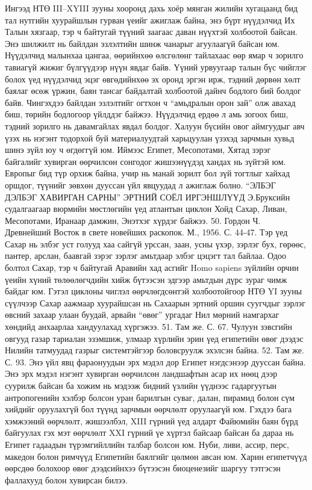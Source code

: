 Ингээд НТӨ III–XYIII зууны хооронд дахь хоёр мянган жилийн хугацаанд бид тал нутгийн хуурайшлын гурван үеийг ажиглаж байна, энэ бүрт нүүдэлчид Их Талын хязгаар, тэр ч байтугай түүний заагаас даван нүүхтэй холбоотой байсан. Энэ шилжилт нь байлдан эзлэлтийн шинж чанарыг агуулаагүй байсан юм. Нүүдэлчид малынхаа цангаа, өөрийнхөө өлсгөлөнг тайлахаас өөр ямар ч зорилго тавиагүй жижиг бүлгүүдээр нүүн явдаг байв.
Үүний урвуугаар талын бүс чийглэг болох үед нүүдэлчид эцэг өвгөдийнхөө эх оронд эргэн ирж, тэдний дөрвөн хөлт баялаг өсөж үржин, баян тансаг байдалтай холбоотой дайнч бодлого бий болдог байв. Чингэхдээ байлдан эзлэлтийг огтхон ч “амьдралын орон зай” олж авахад биш, төрийн бодлогоор үйлддэг байжээ. Нүүдэлчид ердөө л амь зогоох биш, тэдний зорилго нь давамгайлах явдал болдог.
Халуун бүсийн овог аймгуудыг авч үзэх нь нэгэнт тодорхой буй материалуудтай харьцуулан үзэхэд зарчмын хувьд шинэ зүйл юу ч өгдөггүй юм. Иймээс Египет, Месопотами, Хятад зэрэг байгалийг хувирган өөрчилсөн сонгодог жишээнүүдэд хандах нь зүйтэй юм. Европыг бид түр орхиж байна, учир нь манай зорилт бол зүй тогтлыг хайхад оршдог, түүнийг зөвхөн дууссан үйл явцуудад л ажиглаж болно.
“ЭЛБЭГ ДЭЛБЭГ ХАВИРГАН САРНЫ” ЭРТНИЙ СОЁЛ ИРГЭНШЛҮҮД
Э.Бруксийн судалгаагаар вюрмийн мөстлөгийн үед атлантын циклон Хойд Сахар, Ливан, Месопотами, Иранаар дамжин, Энэтхэг хүрдэг байжээ. 50. Гордон Ч. Древнейший Восток в свете новейших раскопок. М., 1956. С. 44-47.
Тэр үед Сахар нь элбэг уст голууд хаа сайгүй урссан, заан, усны үхэр, зэрлэг бух, гөрөөс, пантер, арслан, баавгай зэрэг зэрлэг амьтдаар элбэг цэцэгт тал байлаа. Одоо болтол Сахар, тэр ч байтугай Аравийн хад асгийг Homo sapiens зүйлийн орчин үеийн хүний төлөөлөгчдийн хийж бүтээсэн эдгээр амьтдын дүрс зураг чимж байдаг юм. Гэтэл циклоны чиглэл өөрчлөгдсөнтэй холбоотойгоор НТӨ YI зууны сүүлчээр Сахар аажмаар хуурайшсан нь Сахаарын эртний оршин суугчдыг зэрлэг өвсний захаар улаан буудай, арвайн “өвөг” ургадаг Нил мөрний намгархаг хөндийд анхаарлаа хандуулахад хүргэжээ. 51. Там же. С. 67.
Чулуун зэвсгийн овгууд газар тариалан эзэмшиж, улмаар хүрлийн эрин үед египетийн өвөг дээдэс Нилийн татмуудад газрыг системтэйгээр боловсруулж эхэлсэн байна. 52. Там же. С. 93.
Энэ үйл явц фараонуудын эрх мэдэл дор Египет нэгдсэнээр дууссан байна. Энэ эрх мэдэл нэгэнт хувирган өөрчилсөн ландшафтын асар их нөөц дээр суурилж байсан ба хожим нь мэдээж бидний үзлийн үүднээс гадаргуугын антропогенийн хэлбэр болсон уран барилгын суваг, далан, пирамид болон сүм хийдийг оруулахгүй бол түүнд зарчмын өөрчлөлт оруулаагүй юм. Гэхдээ бага хэмжээний өөрчлөлт, жишээлбэл, XIII гүрний үед алдарт Файюмийн баян бүрд байгуулах гэх мэт өөрчлөлт XXI гүрний үе хүртэл байсаар байсан ба дараа нь Египет гадаадын түрэмгийллийн талбар болсон юм. Нуби, ливи, ассир, перс, македон болон римчүүд Египетийн баялгийг цөлмөн авсан юм. Харин египетчүүд өөрсдөө болохоор өвөг дээдсийнхээ бүтээсэн биоценезийг шаргуу тэтгэсэн фаллахууд болон хувирсан билээ.
